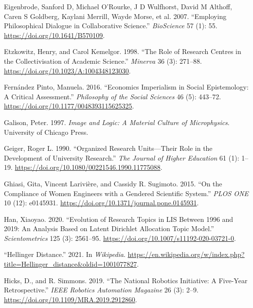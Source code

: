 \documentclass[
  11pt,
]{article}
\newlength{\cslhangindent}
\newenvironment{CSLReferences}[2] %
 {%
  \setlength{\parindent}{0pt}
  \ifodd #1 \everypar{\setlength{\hangindent}{\cslhangindent}}\ignorespaces\fi
  \ifnum #2 > 0
  \setlength{\parskip}{#2\baselineskip}
  \fi
 }%
 {}
\begin{document}
\begin{CSLReferences}{1}{0}
\leavevmode{}%
Eigenbrode, Sanford D, Michael O'Rourke, J D Wulfhorst, David M Althoff, Caren S Goldberg, Kaylani Merrill, Wayde Morse, et al. 2007. {``Employing Philosophical Dialogue in Collaborative Science.''} \emph{BioScience} 57 (1): 55. \url{https://doi.org/10.1641/B570109}.

\leavevmode{}%
Etzkowitz, Henry, and Carol Kemelgor. 1998. {``The Role of Research Centres in the Collectivisation of Academic Science.''} \emph{Minerva} 36 (3): 271--88. \url{https://doi.org/10.1023/A:1004348123030}.

\leavevmode{}%
Fernández Pinto, Manuela. 2016. {``Economics Imperialism in Social Epistemology: A Critical Assessment.''} \emph{Philosophy of the Social Sciences} 46 (5): 443--72. \url{https://doi.org/10.1177/0048393115625325}.

\leavevmode{}%
Galison, Peter. 1997. \emph{Image and Logic: A Material Culture of Microphysics}. University of Chicago Press.

\leavevmode{}%
Geiger, Roger L. 1990. {``Organized Research Units---Their Role in the Development of University Research.''} \emph{The Journal of Higher Education} 61 (1): 1--19. \url{https://doi.org/10.1080/00221546.1990.11775088}.

\leavevmode{}%
Ghiasi, Gita, Vincent Larivière, and Cassidy R. Sugimoto. 2015. {``On the Compliance of Women Engineers with a Gendered Scientific System.''} \emph{PLOS ONE} 10 (12): e0145931. \url{https://doi.org/10.1371/journal.pone.0145931}.

\leavevmode{}%
Han, Xiaoyao. 2020. {``Evolution of Research Topics in LIS Between 1996 and 2019: An Analysis Based on Latent Dirichlet Allocation Topic Model.''} \emph{Scientometrics} 125 (3): 2561--95. \url{https://doi.org/10.1007/s11192-020-03721-0}.

\leavevmode{}%
{``Hellinger Distance.''} 2021. In \emph{Wikipedia}. \url{https://en.wikipedia.org/w/index.php?title=Hellinger_distance\&oldid=1001077827}.

\leavevmode{}%
Hicks, D., and R. Simmons. 2019. {``The National Robotics Initiative: A Five-Year Retrospective.''} \emph{IEEE Robotics Automation Magazine} 26 (3): 2--9. \url{https://doi.org/10.1109/MRA.2019.2912860}.


\end{CSLReferences}
\end{document}
